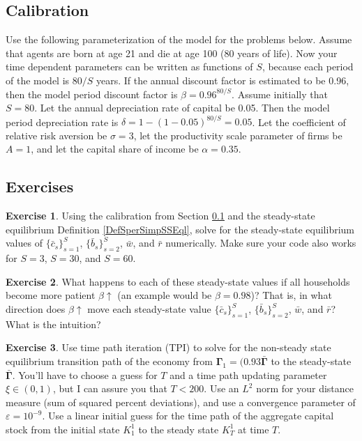 \documentclass[letterpaper,12pt]{article}
\theoremstyle{definition}
\newtheorem{exercise}{Exercise} %
\numberwithin{equation}{section}
\numberwithin{exercise}{section}
\newcommand{\ve}{\varepsilon}
\begin{document}
\begin{spacing}{1.5}
   \subsection{Calibration}\label{SecSperSimpCalibr}

      Use the following parameterization of the model for the problems below. Assume that agents are born at age 21 and die at age 100 (80 years of life). Now your time dependent parameters can be written as functions of $S$, because each period of the model is $80/S$ years. If the annual discount factor is estimated to be 0.96, then the model period discount factor is $\beta = 0.96^{80/S}$. Assume initially that $S=80$. Let the annual depreciation rate of capital be 0.05. Then the model period depreciation rate is $\delta = 1-(1-0.05)^{80/S} = 0.05$. Let the coefficient of relative risk aversion be $\sigma = 3$, let the productivity scale parameter of firms be $A=1$, and let the capital share of income be $\alpha = 0.35$.


   \subsection{Exercises}\label{SecSperSimpEx}

      \begin{exercise} \label{ExSperSimp_SS}
         Using the calibration from Section \ref{SecSperSimpCalibr} and the steady-state equilibrium Definition \ref{DefSperSimpSSEql}, solve for the steady-state equilibrium values of $\{\bar{c}_s\}_{s=1}^S$, $\{\bar{b}_s\}_{s=2}^S$, $\bar{w}$, and $\bar{r}$ numerically. Make sure your code also works for $S=3$, $S=30$, and $S=60$.
      \end{exercise}

      \begin{exercise} \label{ExSperSimp_rho}
         What happens to each of these steady-state values if all households become more patient $\beta\uparrow$ (an example would be $\beta = 0.98$)? That is, in what direction does $\beta\uparrow$ move each steady-state value $\{\bar{c}_s\}_{s=1}^S$, $\{\bar{b}_s\}_{s=2}^S$, $\bar{w}$, and $\bar{r}$? What is the intuition?
      \end{exercise}

      \begin{exercise} \label{ExSperSimp_TPI}
         Use time path iteration (TPI) to solve for the non-steady state equilibrium transition path of the economy from $\bm{\Gamma}_1=(0.93\bm{\bar{\Gamma}}$ to the steady-state $\bm{\bar{\Gamma}}$. You'll have to choose a guess for $T$ and a time path updating parameter $\xi\in(0,1)$, but I can assure you that $T<200$. Use an $L^2$ norm for your distance measure (sum of squared percent deviations), and use a convergence parameter of $\ve = 10^{-9}$. Use a linear initial guess for the time path of the aggregate capital stock from the initial state $K_1^1$ to the steady state $K_T^1$ at time $T$.
      \end{exercise}


\end{spacing}
\end{document}

